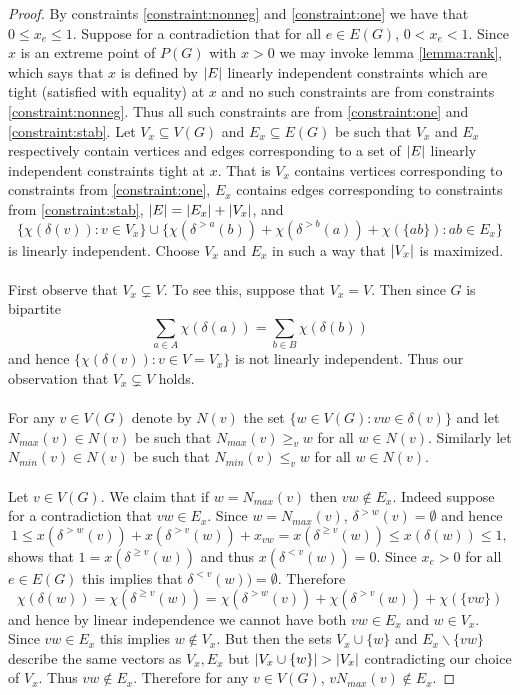 \begin{proof}
By constraints \ref{constraint:nonneg} and \ref{constraint:one} we have that $0 \leq x_e \leq 1$. Suppose for a contradiction that for all $e \in E(G)$, $0 <x_e < 1$. Since $x$ is an extreme point of $P(G)$ with $x>0$ we may invoke lemma \ref{lemma:rank}, which says that $x$ is defined by $\left|E\right|$ linearly independent constraints which are tight (satisfied with equality) at $x$ and no such constraints are from constraints \ref{constraint:nonneg}. Thus all such constraints are from \ref{constraint:one} and \ref{constraint:stab}. Let $V_x \subseteq V(G)$ and $E_x \subseteq E(G)$ be such that $V_x$ and $E_x$ respectively contain vertices and edges corresponding to a set of $\left|E\right|$ linearly independent constraints tight at $x$. That is $V_x$ contains vertices corresponding to constraints from \ref{constraint:one}, $E_x$ contains edges corresponding to constraints from \ref{constraint:stab}, $\left|E\right| = \left|E_x\right| + \left|V_x\right|$, and $$\{\chi(\delta(v)) : v \in V_x\} \cup \{\chi(\delta^{>a}(b)) + \chi(\delta^{>b}(a)) + \chi(\{ab\}): ab \in E_x\}$$ is linearly independent. Choose $V_x$ and $E_x$ in such a way that $\left|V_x\right|$ is maximized.
\paragraph{}
First observe that $V_x \subsetneq V$. To see this, suppose that $V_x = V$. Then since $G$ is bipartite
$$\sum_{a \in A} \chi(\delta(a)) = \sum_{b \in B} \chi(\delta(b))$$
and hence $\{\chi(\delta(v)) : v \in V=V_x\}$ is not linearly independent. Thus our observation that $V_x \subsetneq V$ holds.
\paragraph{}
For any $v \in V(G)$ denote by $N(v)$ the set $\{ w \in V(G): vw \in \delta(v)\}$ and let $N_{max}(v) \in N(v)$ be such that $N_{max}(v) \geq_v w$ for all $w \in N(v)$. Similarly let $N_{min}(v) \in N(v)$ be such that $N_{min}(v) \leq_v w$ for all $w \in N(v)$.
\paragraph{}
Let $v \in V(G)$. We claim that if $w = N_{max}(v)$ then $vw \not\in E_x$. Indeed suppose for a contradiction that $vw \in E_x$. Since $w = N_{max}(v)$, $\delta^{>w}(v) = \emptyset$ and hence
$$1 \leq x(\delta^{>w}(v)) + x(\delta^{>v}(w)) + x_{vw}  = x(\delta^{\geq v}(w)) \leq x(\delta(w)) \leq 1,$$
shows that $1 = x(\delta^{\geq v}(w))$ and thus $x(\delta^{<v}(w))= 0$. Since $x_e > 0$ for all $e \in E(G)$ this implies that $\delta^{<v}(w)) = \emptyset$. Therefore
$$\chi(\delta(w)) = \chi(\delta^{\geq v}(w)) = \chi(\delta^{>w}(v)) + \chi(\delta^{>v}(w)) + \chi(\{vw\})$$
and hence by linear independence we cannot have both $vw \in E_x$ and $w \in V_x$. Since $vw \in E_x$ this implies $w \not\in V_x$. But then the sets $V_x \cup\{w\}$ and $E_x \backslash\{vw\}$ describe the same vectors as $V_x, E_x$ but $\left|V_x \cup\{w\}\right| > \left|V_x\right|$ contradicting our choice of $V_x$. Thus $vw \not\in E_x$. Therefore for any $v \in V(G)$, $vN_{max}(v) \not\in E_x$.

\end{proof}
